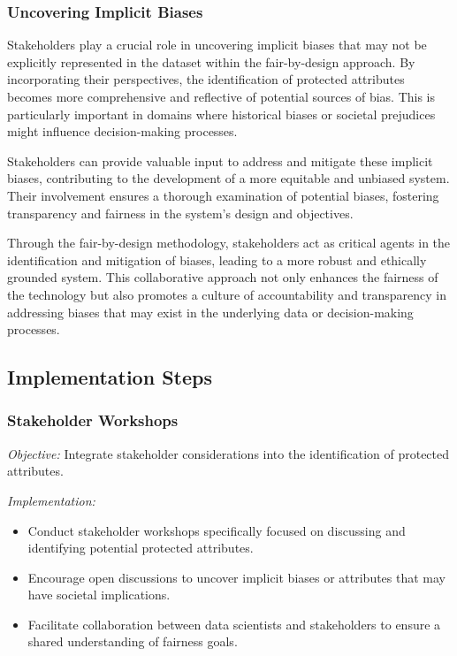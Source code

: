 \documentclass[12pt,a4paper,openright,twoside]{book}
\begin{document}
\subsubsection{Uncovering Implicit Biases}


Stakeholders play a crucial role in uncovering implicit biases that may not be explicitly represented in the dataset within the fair-by-design approach. By incorporating their perspectives, the identification of protected attributes becomes more comprehensive and reflective of potential sources of bias. This is particularly important in domains where historical biases or societal prejudices might influence decision-making processes.

Stakeholders can provide valuable input to address and mitigate these implicit biases, contributing to the development of a more equitable and unbiased system. Their involvement ensures a thorough examination of potential biases, fostering transparency and fairness in the system's design and objectives.

Through the fair-by-design methodology, stakeholders act as critical agents in the identification and mitigation of biases, leading to a more robust and ethically grounded system. This collaborative approach not only enhances the fairness of the technology but also promotes a culture of accountability and transparency in addressing biases that may exist in the underlying data or decision-making processes.

\subsection{Implementation Steps}

\subsubsection{Stakeholder Workshops}

\emph{Objective:} Integrate stakeholder considerations into the identification of protected attributes.

\emph{Implementation:}

\begin{itemize}

    \item Conduct stakeholder workshops specifically focused on discussing and identifying potential protected attributes.

    \item Encourage open discussions to uncover implicit biases or attributes that may have societal implications.

    \item Facilitate collaboration between data scientists and stakeholders to ensure a shared understanding of fairness goals.

\end{itemize}
\end{document}
